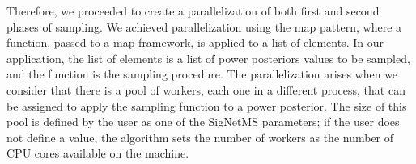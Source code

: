 
Therefore, we proceeded to create a parallelization of both first and
second phases of sampling. We achieved parallelization using the map
pattern, where a function, passed to a map framework, is applied to a
list of elements. In our application, the list of elements is a list of
power posteriors values to be sampled, and the function is the sampling
procedure. The parallelization arises when we consider that there is a
pool of workers, each one in a different process, that can be assigned
to apply the sampling function to a power posterior. The size of this
pool is defined by the user as one of the SigNetMS parameters; if the
user does not define a value, the algorithm sets the number of workers
as the number of CPU cores available on the machine. 


